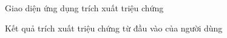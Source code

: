\begin{figure}[H]
\centering
{}
\caption{Giao diện ứng dụng trích xuất triệu chứng}
\label{fig:web-demo}
\end{figure}

\begin{figure}[H]
\centering
{}
\caption{Kết quả trích xuất triệu chứng từ đầu vào của người dùng}
\label{fig:web-demo-result}
\end{figure}
